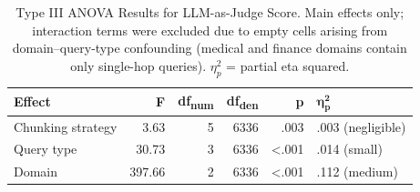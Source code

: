 \begin{table}[h]
\centering
\caption{Type III ANOVA Results for LLM-as-Judge Score. Main effects only; interaction terms were excluded due to empty cells arising from domain--query-type confounding (medical and finance domains contain only single-hop queries). $\eta^2_p$ = partial eta squared.}
\label{tab:anova}
\begin{tabular}{lrrrrl}
\toprule
\textbf{Effect} & \textbf{F} & \textbf{df\textsubscript{num}} & \textbf{df\textsubscript{den}} & \textbf{p} & $\boldsymbol{\eta^2_p}$ \\
\midrule
Chunking strategy & 3.63 & 5 & 6336 & .003 & .003 (negligible) \\
Query type        & 30.73 & 3 & 6336 & <.001 & .014 (small) \\
Domain            & 397.66 & 2 & 6336 & <.001 & .112 (medium) \\
\bottomrule
\end{tabular}
\end{table}
